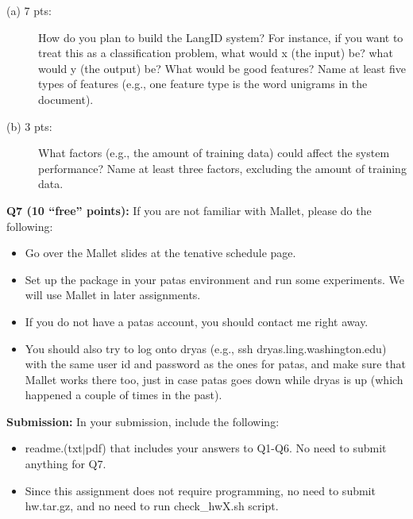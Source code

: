 \documentclass[11pt]{article}
\begin{document}
\begin{description}
  \item [(a) 7 pts:] How do you plan to build the LangID system? For instance, 
       if you want to treat this as a classification problem, 
       what would x (the input) be? what would y (the output) be?
       What would be good features? Name at least five types of features
       (e.g., one feature type is the word unigrams in the document).

  \item [(b) 3 pts:] 
          What factors (e.g., the amount of training data) could affect
          the system performance? Name at least three factors, excluding
          the amount of training data.
\end{description}



\vspace{0.3 in}
\hspace{-0.3in}
{\bf Q7 (10 ``free'' points):}
If you are not familiar with Mallet, please do the following:
\begin{itemize}
   \item Go over the Mallet slides at the tenative schedule page.
   \item Set up the package in your patas environment and run some experiments.
     We will use Mallet in later assignments.
   \item If you do not have a patas account, you should contact
     me right away.
   \item You should also try to log onto dryas
     (e.g., ssh dryas.ling.washington.edu) with the same user id and password
     as the ones for patas, and make sure that Mallet works there too,
     just in case patas goes down while dryas is up (which happened a couple
     of times in the past).
     
\end{itemize}



\newpage
\hspace{-0.3in}
{\bf Submission:} In your submission, include the following:
\begin{itemize}
  \item readme.(txt$\mid$pdf) that includes your answers to Q1-Q6. 
    No need to submit anything for Q7.
    
  \item Since this assignment does not require programming,
      no need to submit hw.tar.gz,
      and no need to run check\_hwX.sh script.
   
\end{itemize}
\end{document}
